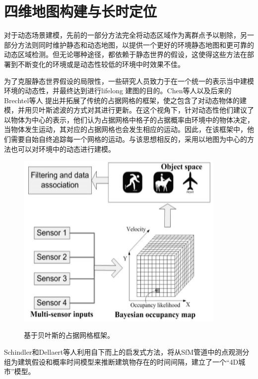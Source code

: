 \section{四维地图构建与长时定位}
\label{subsec:4Dmapping}
对于动态场景建模，先前的一部分方法完全将动态区域作为离群点予以剔除，另一部分方法则同时维护静态和动态地图，以提供一个更好的环境静态地图和更可靠的动态区域检测。但无论哪种途径，都依赖于静态世界的假设，这使得这些方法在部署到不断变化的环境或是动态性较低的环境中时效果不佳。

为了克服静态世界假设的局限性，一些研究人员致力于在一个统一的表示当中建模环境的动态性，并最终达到进行lifelong 建图的目的。Chen等人\cite{Chen2006Dynamic}以及后来的Brechtel等人\cite{Brechtel2010Recursive} 提出并拓展了传统的占据网格的框架，使之包含了对动态物体的建模，并用贝叶斯滤波的方式对其进行更新。在这个视角下，针对动态性他们建议了以物体为中心的表示，他们认为占据网格中格子的占据概率由环境中的物体决定，当物体发生运动，其对应的占据网格也会发生相应的运动。因此，在该框架中，他们需要自始自终追踪每一个网格的运动。与该思想相反的，采用以地图为中心的方法也可以对环境中的动态进行建模。

\begin{figure}[htbp]
	\centering
	\includegraphics[width=0.9\textwidth]{figs/2-3/bayesian.png}
	\label{fig: object tracking system}
	\caption{基于贝叶斯的占据网格框架。}
\end{figure}

Schindler和Dellaert等人\cite{Schindler2010Probabilistic}利用自下而上的启发式方法，将从SfM管道中的点观测分组为建筑假设和概率时间模型来推断建筑物存在的时间间隔，建立了一个“4D城市”模型。

